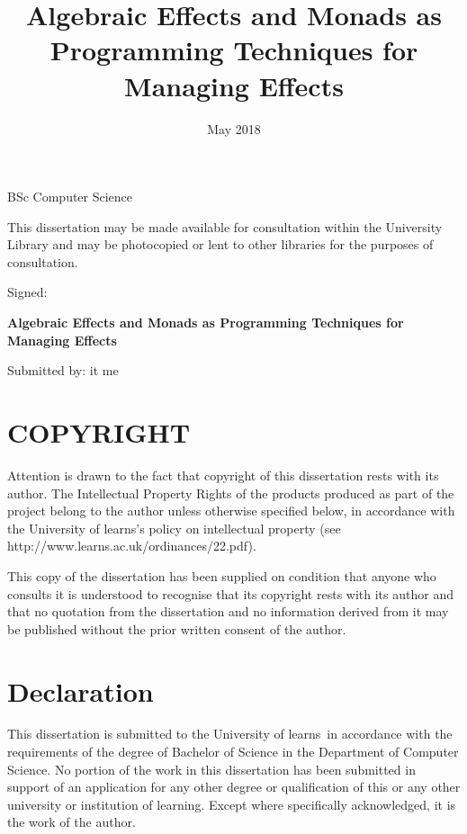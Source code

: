 \documentclass[a4paper,10pt]{article}
\title{Algebraic Effects and Monads as Programming Techniques for Managing Effects}
\author{\name}
\date{May 2018}
\newenvironment{spaced}[1]
  {\begin{minipage}[c]{\textwidth}\vspace{#1}}
  {\end{minipage}}
\theoremstyle{definition}
\newcommand\name{it me}
\newcommand\uni{learns}
\begin{document}
\maketitle
\begin{center}
BSc Computer Science
\end{center}

\pagebreak
This dissertation may be made available for
consultation within the University Library and
may be photocopied or lent to other libraries for the purposes of consultation.

\begin{spaced}{5em}
Signed:
\end{spaced}

\pagebreak
  \thispagestyle{empty}
  \begin{spaced}{4em}
    \begin{center}
      \LARGE\textbf{Algebraic Effects and Monads as Programming Techniques for Managing Effects}
    \end{center}
  \end{spaced}
  \begin{spaced}{3em}
    \begin{center}
      Submitted by: \name
    \end{center}
  \end{spaced}
  \begin{spaced}{5em}
    \section*{COPYRIGHT}

    Attention is drawn to the fact that copyright of this dissertation rests
    with its author. The Intellectual Property Rights of the products
    produced as part of the project belong to the author unless otherwise specified
    below, in accordance with the University of \uni's policy on intellectual property
   (see http://www.\uni.ac.uk/ordinances/22.pdf).

    This copy of the dissertation has been supplied on condition that anyone
    who consults it is understood to recognise that its copyright rests with its
    author and that no quotation from the dissertation and no information
    derived from it may be published without the prior written consent of
    the author.

    \section*{Declaration}
    This dissertation is submitted to the University of \uni\ in accordance
    with the requirements of the degree of Bachelor of Science in the
    Department of Computer Science. No portion of the work in this dissertation
    has been submitted in support of an application for any other degree
    or qualification of this or any other university or institution of learning.
    Except where specifically acknowledged, it is the work of the author.
  \end{spaced}
\end{document}
